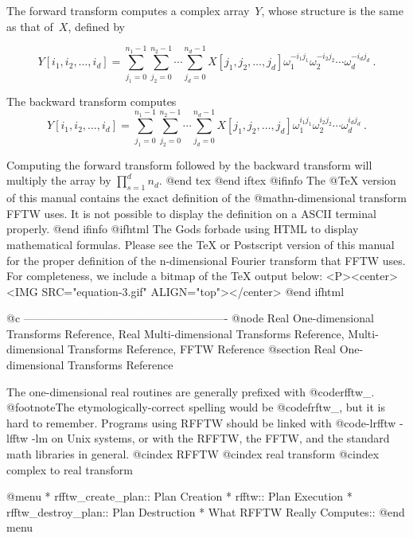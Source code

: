 The forward transform computes a complex array~$Y$, whose
structure is the same as that of~$X$, defined by

$$
Y[i_1, i_2, \ldots, i_d] =
    \sum_{j_1 = 0}^{n_1 - 1}
        \sum_{j_2 = 0}^{n_2 - 1}
           \cdots
              \sum_{j_d = 0}^{n_d - 1}
                  X[j_1, j_2, \ldots, j_d] 
                      \omega_1^{-i_1 j_1}
                      \omega_2^{-i_2 j_2}
                      \cdots
                      \omega_d^{-i_d j_d} \ .
$$

The backward transform computes
$$
Y[i_1, i_2, \ldots, i_d] =
    \sum_{j_1 = 0}^{n_1 - 1}
        \sum_{j_2 = 0}^{n_2 - 1}
           \cdots
              \sum_{j_d = 0}^{n_d - 1}
                  X[j_1, j_2, \ldots, j_d] 
                      \omega_1^{i_1 j_1}
                      \omega_2^{i_2 j_2}
                      \cdots
                      \omega_d^{i_d j_d} \ .
$$

Computing the forward transform followed by the backward transform
will multiply the array by $\prod_{s=1}^{d} n_d$.
@end tex
@end iftex
@ifinfo
The @TeX{} version of this manual contains the exact definition of the
@math{n}-dimensional transform FFTW uses.  It is not possible to
display the definition on a ASCII terminal properly.
@end ifinfo
@ifhtml
The Gods forbade using HTML to display mathematical formulas.  Please
see the TeX or Postscript version of this manual for the proper
definition of the n-dimensional Fourier transform that FFTW
uses.  For completeness, we include a bitmap of the TeX output below:
<P><center><IMG SRC="equation-3.gif" ALIGN="top"></center>
@end ifhtml

@c -------------------------------------------------------
@node Real One-dimensional Transforms Reference, Real Multi-dimensional Transforms Reference, Multi-dimensional Transforms Reference, FFTW Reference
@section Real One-dimensional Transforms Reference

The one-dimensional real routines are generally prefixed with
@code{rfftw_}. @footnote{The etymologically-correct spelling would be
@code{frftw_}, but it is hard to remember.}  Programs using RFFTW
should be linked with @code{-lrfftw -lfftw -lm} on Unix systems, or with
the RFFTW, the FFTW, and the standard math libraries in general.
@cindex RFFTW
@cindex real transform
@cindex complex to real transform

@menu
* rfftw_create_plan::           Plan Creation   
* rfftw::                       Plan Execution  
* rfftw_destroy_plan::          Plan Destruction
* What RFFTW Really Computes::  
@end menu

